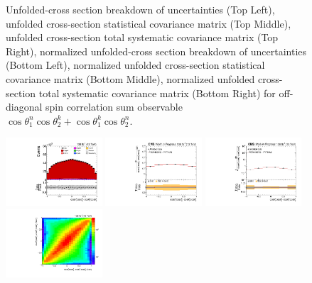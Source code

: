 \begin{figure}[htb]
\begin{center}
\caption{Unfolded-cross section breakdown of uncertainties (Top Left), unfolded cross-section statistical covariance matrix (Top Middle), unfolded cross-section total systematic covariance matrix (Top Right), normalized unfolded-cross section breakdown of uncertainties (Bottom Left), normalized unfolded cross-section statistical covariance matrix (Bottom Middle), normalized unfolded cross-section total systematic covariance matrix (Bottom Right) for off-diagonal spin correlation sum observable $\cos\theta_{1}^{n}\cos\theta_{2}^{k}+\cos\theta_{1}^{k}\cos\theta_{2}^{n}$.}
\label{fig:c_Pnk_uncertainties}
\end{center}
\end{figure}
\clearpage
\begin{figure}[htb]
\begin{center}
 \includegraphics[width=0.32\textwidth]{fig_fullRun2UL/controlplots/combined/Hyp_LLBarCMnk.pdf}
 \includegraphics[width=0.32\textwidth]{fig_fullRun2UL/unfolding/combined/UnfoldedResults_c_Mnk.pdf}
 \includegraphics[width=0.32\textwidth]{fig_fullRun2UL/unfolding/combined/UnfoldedResultsNorm_c_Mnk.pdf} \\
 \includegraphics[width=0.32\textwidth]{fig_fullRun2UL/unfolding/combined/ResponseMatrix_c_Mnk.pdf}

\end{center}
\end{figure}
